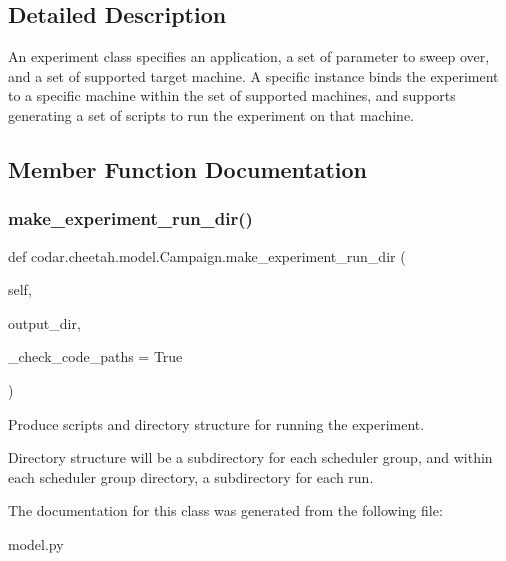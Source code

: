 \subsection{Detailed Description}
\begin{DoxyVerb}An experiment class specifies an application, a set of parameter to
sweep over, and a set of supported target machine. A specific instance
binds the experiment to a specific machine within the set of supported
machines, and supports generating a set of scripts to run the experiment
on that machine.\end{DoxyVerb}
 

\subsection{Member Function Documentation}
\mbox{\label{classcodar_1_1cheetah_1_1model_1_1_campaign_a09266b3421f37a82d8e12c1272e3f54b}} 
\subsubsection{\texorpdfstring{make\+\_\+experiment\+\_\+run\+\_\+dir()}{make\_experiment\_run\_dir()}}
{\footnotesize\ttfamily def codar.\+cheetah.\+model.\+Campaign.\+make\+\_\+experiment\+\_\+run\+\_\+dir (\begin{DoxyParamCaption}\item[{}]{self,  }\item[{}]{output\+\_\+dir,  }\item[{}]{\+\_\+check\+\_\+code\+\_\+paths = {\ttfamily True} }\end{DoxyParamCaption})}

\begin{DoxyVerb}Produce scripts and directory structure for running the experiment.

Directory structure will be a subdirectory for each scheduler group,
and within each scheduler group directory, a subdirectory for each
run.\end{DoxyVerb}
 

The documentation for this class was generated from the following file\+:\begin{DoxyCompactItemize}
\item 
model.\+py\end{DoxyCompactItemize}
